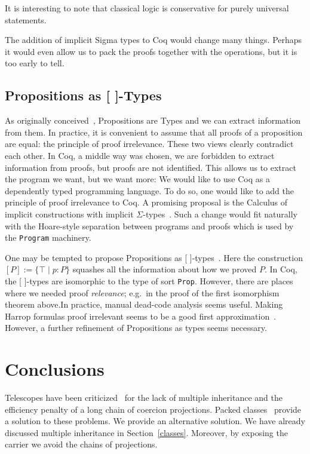 \documentclass[a4paper,10pt,runningheads]{llncs}
\begin{document}
It is interesting to note that classical logic is conservative for purely universal statements.

The addition of implicit Sigma types to Coq would change many things. Perhaps it would even allow us
to pack the proofs together with the operations, but it is too early to tell.

\subsection{Propositions as [ ]-Types}
As originally conceived~\cite{ITT,CMCP}, Propositions are Types and we can extract information from
them. In practice, it is convenient to assume that all proofs of a proposition are equal: the
principle of proof irrelevance. These two views clearly contradict each other. In Coq, a middle way
was chosen, we are forbidden to extract information from proofs, but proofs are not identified.
This allows us to extract the program we want, but we want more:
We would like to use Coq as a dependently typed programming language. To do so,
one would like to add the principle of proof irrelevance to Coq. A promising proposal is the
Calculus of implicit constructions with implicit
$\Sigma$-types~\cite{miquel2001implicit,barras2008implicit,Bernardo}. Such a change would fit
naturally with the Hoare-style separation between programs and proofs which is used by the \lstinline|Program| machinery. 

One may be tempted to propose Propositions as [ ]-types~\cite{awodey2004propositions}. Here the
construction $[P]:=\{\top\mid p:P\}$ squashes all the information about how we proved $P$. In Coq,
the [ ]-types are isomorphic to the type of sort \lstinline|Prop|. However,
there are places where we needed proof \emph{relevance}; e.g.\ in the proof of the first isomorphism
theorem above.In practice, manual dead-code analysis seems useful. Making Harrop formulas proof
irrelevant seems to be a good first approximation~\cite{lcf:spi:03}. However, a further refinement
of Propositions as types seems necessary.

\section{Conclusions}
Telescopes have been criticized~\cite{Packed} for the lack of multiple inheritance and
the efficiency penalty of a long chain of coercion projections. Packed classes~\cite{Packed} provide
a solution to these problems. We provide an alternative solution. We have already
discussed multiple inheritance in Section~\ref{classes}. Moreover, by exposing the
carrier we avoid the chains of projections.
\end{document}
